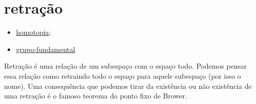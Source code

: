 \section{retração}
\label{retração}

\begin{itemize}{Lista de Dependências}
    \item \hyperref[homotopia]{homotopia};\\ %
    \item \hyperref[grupo-fundamental]{grupo-fundamental}
\end{itemize}

Retração é uma relação de um subespaço com o espaço todo. Podemos pensar essa relação como retraindo todo o espaço para aquele subespaço (por isso o nome). Uma consequência que podemos tirar da existência ou não existência de uma retração é o famoso teorema do ponto fixo de Brower. 




